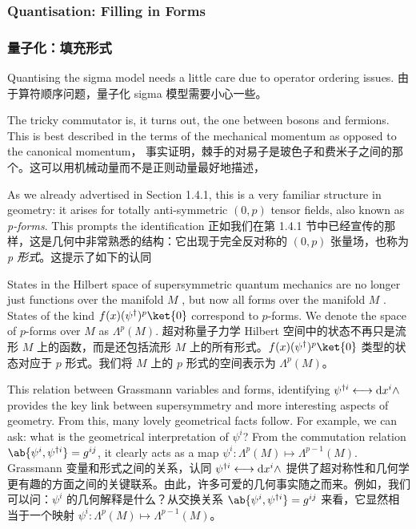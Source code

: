 \documentclass{article}
\begin{document}
\begin{paracol}{2}
\subsubsection{Quantisation: Filling in Forms}
\switchcolumn
\subsubsection*{量子化：填充形式}
\switchcolumn*

Quantising the sigma model needs a little care due to operator ordering issues.
\switchcolumn
由于算符顺序问题，量子化 sigma 模型需要小心一些。
\switchcolumn*

The tricky commutator is, it turns out, the one between bosons and fermions. This is best described in the terms of the mechanical momentum as opposed to the canonical momentum，
\switchcolumn
事实证明，棘手的对易子是玻色子和费米子之间的那个。这可以用机械动量而不是正则动量最好地描述，
\switchcolumn*

As we already advertised in Section 1.4.1, this is a very familiar structure in geometry: it arises for totally anti-symmetric $(0, p)$ tensor fields, also known as \textit{p-forms}. This prompts the identification
\switchcolumn
正如我们在第 1.4.1 节中已经宣传的那样，这是几何中非常熟悉的结构：它出现于完全反对称的 $(0, p)$ 张量场，也称为 \textit{p 形式}。这提示了如下的认同
\switchcolumn*

States in the Hilbert space of supersymmetric quantum mechanics are no longer just functions over the manifold $M$ , but now all forms over the manifold $M$ . States of the kind $f(x) (\psi^{\dagger})^{p} \ket{0}$ correspond to $p$-forms. We denote the space of $p$-forms over $M$ as $\Lambda^{p}(M)$.
\switchcolumn
超对称量子力学 Hilbert 空间中的状态不再只是流形 $M$ 上的函数，而是还包括流形 $M$ 上的所有形式。$f(x) (\psi^{\dagger})^{p} \ket{0}$ 类型的状态对应于 $p$ 形式。我们将 $M$ 上的 $p$ 形式的空间表示为 $\Lambda^{p}(M)$。
\switchcolumn*

This relation between Grassmann variables and forms, identifying $\psi^{\dagger i} \longleftrightarrow \odif{x}^i \wedge$ provides the key link between supersymmetry and more interesting aspects of geometry. From this, many lovely geometrical facts follow. For example, we can ask: what is the geometrical interpretation of $\psi^i$? From the commutation relation $\ab\{\psi^i, \psi^{\dagger i}\} = g^{ij}$, it clearly acts as a map $\psi^{i}: \Lambda^p(M) \mapsto \Lambda^{p - 1}(M)$.
\switchcolumn
Grassmann 变量和形式之间的关系，认同 $\psi^{\dagger i} \longleftrightarrow \odif{x}^i \wedge$ 提供了超对称性和几何学更有趣的方面之间的关键联系。由此，许多可爱的几何事实随之而来。例如，我们可以问：$\psi^i$ 的几何解释是什么？从交换关系 $\ab\{\psi^i, \psi^{\dagger i}\} = g^{ij}$ 来看，它显然相当于一个映射 $\psi^{i}: \Lambda^p (M) \mapsto \Lambda^{p - 1}(M)$。
\switchcolumn*


\end{paracol}
\end{document}
